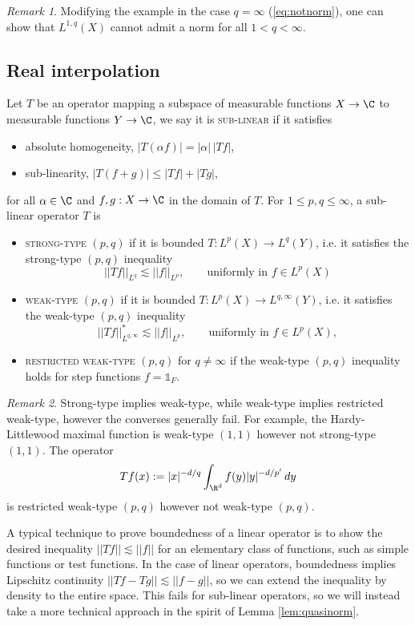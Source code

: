 \documentclass[reqno]{amsart}
\theoremstyle{definition}
\theoremstyle{remark}
\newtheorem*{remark}{Remark}
\renewcommand{\emph}{\textsc}
\begin{document}
\begin{remark}
	Modifying the example in the case $q = \infty$ (\ref{eq:notnorm}), one can show that $L^{1, q} (X)$ cannot admit a norm for all $1 < q < \infty$. 
\end{remark}

\subsection{Real interpolation}

Let $T$ be an operator mapping a subspace of measurable functions $X \to \C$ to measurable functions $Y \to \C$, we say it is \emph{sub-linear} if it satisfies
	\begin{itemize}
		\item absolute homogeneity, $|T(\alpha f)| = |\alpha| \, |Tf|$,
		\item sub-linearity, $|T(f + g)| \leq |Tf| + |Tg|$,
	\end{itemize}
for all $\alpha \in \C$ and $f, g : X \to \C$ in the domain of $T$. For $1 \leq p, q \leq \infty$, a sub-linear operator $T$ is 
	\begin{itemize}
		\item \emph{strong-type} $(p, q)$ if it is bounded $T : L^p (X) \to L^q(Y)$, i.e. it satisfies the strong-type $(p, q)$ inequality
	\[ ||Tf||_{L^q} \lesssim ||f||_{L^p}, \qquad \text{uniformly in $f \in L^p (X)$} \]
		\item \emph{weak-type} $(p, q)$ if it is bounded $T: L^{p} (X) \to L^{q, \infty} (Y)$, i.e. it satisfies the weak-type $(p, q)$ inequality
	\[ ||Tf||_{L^{q, \infty}}^* \lesssim ||f||_{L^p}, \qquad \text{uniformly in $f \in L^p (X)$} ,\]
		\item \emph{restricted weak-type} $(p, q)$ for $q \neq \infty$ if the weak-type $(p, q)$ inequality holds for step functions $f = \mathbb 1_F$.
	\end{itemize}	
\begin{remark}
	Strong-type implies weak-type, while weak-type implies restricted weak-type, however the converses generally fail. For example, the Hardy-Littlewood maximal function is weak-type $(1, 1)$ however not strong-type $(1, 1)$. The operator
		\[ Tf (x) := |x|^{-d/q} \int_{\R^d} f(y) |y|^{-d/p'} \, dy\]
	is restricted weak-type $(p, q)$ however not weak-type $(p, q)$. 	
\end{remark}

A typical technique to prove boundedness of a linear operator is to show the desired inequality $||Tf|| \lesssim ||f||$ for an elementary class of functions, such as simple functions or test functions. In the case of linear operators, boundedness implies Lipschitz continuity $||Tf - Tg|| \lesssim ||f - g||$, so we can extend the inequality by density to the entire space. This fails for sub-linear operators, so we will instead take a more technical approach in the spirit of Lemma \ref{lem:quasinorm}. 
\end{document}
